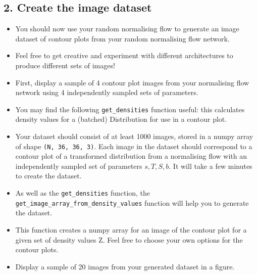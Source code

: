 \documentclass[11pt]{article}
\providecommand{\tightlist}{%
      \setlength{\itemsep}{0pt}\setlength{\parskip}{0pt}}
\begin{document}
    \subsection{2. Create the image dataset}\label{create-the-image-dataset}

\begin{itemize}
\tightlist
\item
  You should now use your random normalising flow to generate an image
  dataset of contour plots from your random normalising flow network.
\item
  Feel free to get creative and experiment with different architectures
  to produce different sets of images!
\item
  First, display a sample of 4 contour plot images from your normalising
  flow network using 4 independently sampled sets of parameters.
\item
  You may find the following \texttt{get\_densities} function useful:
  this calculates density values for a (batched) Distribution for use in
  a contour plot.
\item
  Your dataset should consist of at least 1000 images, stored in a numpy
  array of shape \texttt{(N,\ 36,\ 36,\ 3)}. Each image in the dataset
  should correspond to a contour plot of a transformed distribution from
  a normalising flow with an independently sampled set of parameters
  \(s, T, S, b\). It will take a few minutes to create the dataset.
\item
  As well as the \texttt{get\_densities} function, the
  \texttt{get\_image\_array\_from\_density\_values} function will help
  you to generate the dataset.
\item
  This function creates a numpy array for an image of the contour plot
  for a given set of density values Z. Feel free to choose your own
  options for the contour plots.
\item
  Display a sample of 20 images from your generated dataset in a figure.
\end{itemize}
\end{document}
